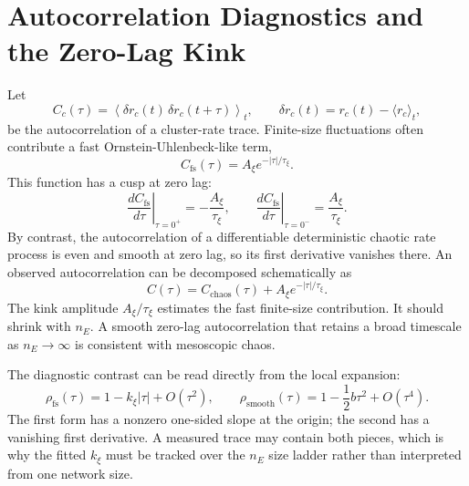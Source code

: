 \section{Autocorrelation Diagnostics and the Zero-Lag Kink}
\label{sec:ch09-autocorrelation-kink}

Let
\begin{equation}
    C_c(\tau)
    =
    \left\langle
    \delta r_c(t)\,\delta r_c(t+\tau)
    \right\rangle_t,
    \qquad
    \delta r_c(t)=r_c(t)-\langle r_c\rangle_t ,
    \label{eq:ch09-cluster-autocorrelation}
\end{equation}
be the autocorrelation of a cluster-rate trace. Finite-size fluctuations often
contribute a fast Ornstein-Uhlenbeck-like term,
\begin{equation}
    C_{\mathrm{fs}}(\tau)
    =
    A_\xi e^{-|\tau|/\tau_\xi}.
    \label{eq:ch09-ou-autocorrelation}
\end{equation}
This function has a cusp at zero lag:
\begin{equation}
    \left.\frac{d C_{\mathrm{fs}}}{d\tau}\right|_{\tau=0^+}
    =
    -\frac{A_\xi}{\tau_\xi},
    \qquad
    \left.\frac{d C_{\mathrm{fs}}}{d\tau}\right|_{\tau=0^-}
    =
    \frac{A_\xi}{\tau_\xi}.
    \label{eq:ch09-kink-derivative}
\end{equation}
By contrast, the autocorrelation of a differentiable deterministic chaotic rate
process is even and smooth at zero lag, so its first derivative vanishes there.
An observed autocorrelation can be decomposed schematically as
\begin{equation}
    C(\tau)
    =
    C_{\mathrm{chaos}}(\tau)
    +
    A_\xi e^{-|\tau|/\tau_\xi}.
    \label{eq:ch09-autocorrelation-mixture}
\end{equation}
The kink amplitude \(A_\xi/\tau_\xi\) estimates the fast finite-size
contribution. It should shrink with \(n_E\). A smooth zero-lag autocorrelation
that retains a broad timescale as \(n_E\to\infty\) is consistent with
mesoscopic chaos.

The diagnostic contrast can be read directly from the local expansion:
\[
    \rho_{\mathrm{fs}}(\tau)=1-k_\xi|\tau|+O(\tau^2),
    \qquad
    \rho_{\mathrm{smooth}}(\tau)=1-\frac{1}{2}b\tau^2+O(\tau^4).
\]
The first form has a nonzero one-sided slope at the origin; the second has a
vanishing first derivative. A measured trace may contain both pieces, which is
why the fitted \(k_\xi\) must be tracked over the \(n_E\) size ladder rather
than interpreted from one network size.

